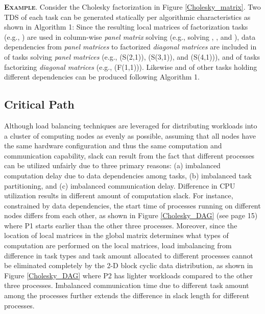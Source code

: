 \documentclass[12pt]{elsarticle}
\begin{document}
\vspace{1mm}
\noindent\textsc{\textbf{Example}}. Consider the Cholesky factorization in Figure \ref{Cholesky_matrix}. Two TDS of each task can be generated statically per algorithmic characteristics as shown in Algorithm 1: Since the resulting local matrices of factorization tasks (e.g., ) are used in column-wise \emph{panel matrix} solving (e.g., solving , , and ), data dependencies from \emph{panel matrices} to factorized \emph{diagonal matrices} are included in  of tasks solving \emph{panel matrices} (e.g., \textsf{(S(2,1))}, \textsf{(S(3,1))}, and \textsf{(S(4,1))}), and  of tasks factorizing \emph{diagonal matrices} (e.g., \textsf{(F(1,1))}). Likewise  and  of other tasks holding different dependencies can be produced following Algorithm 1.

\subsection{Critical Path}

Although load balancing techniques are leveraged for distributing workloads into a cluster of computing nodes as evenly as possible, assuming that all nodes have the same hardware configuration and thus the same computation and communication capability, slack can result from the fact that different processes can be utilized unfairly due to three primary reasons: (a) imbalanced computation delay due to data dependencies among tasks, (b) imbalanced task partitioning, and (c) imbalanced communication delay. Difference in CPU utilization results in different amount of computation slack. For instance, constrained by data dependencies, the start time of processes running on different nodes differs from each other, as shown in Figure \ref{Cholesky_DAG} (see page 15) where \textsf{P1} starts earlier than the other three processes. Moreover, since the location of local matrices in the global matrix determines what types of computation are performed on the local matrices, load imbalancing from difference in task types and task amount allocated to different processes cannot be eliminated completely by the 2-D block cyclic data distribution, as shown in Figure \ref{Cholesky_DAG} where \textsf{P2} has lighter workloads compared to the other three processes. Imbalanced communication time due to different task amount among the processes further extends the difference in slack length for different processes.
\end{document}

